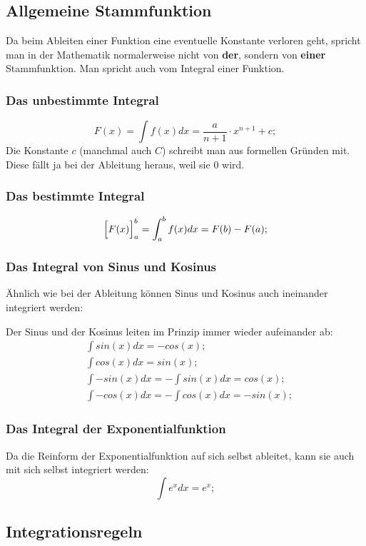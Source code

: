\documentclass[a4paper]{article}
\begin{document}
\subsection{Allgemeine Stammfunktion}
Da beim Ableiten einer Funktion eine eventuelle Konstante verloren geht, spricht man in der Mathematik normalerweise nicht von \textbf{der}, sondern von \textbf{einer} Stammfunktion. Man spricht auch vom Integral einer Funktion.

\subsubsection{Das unbestimmte Integral}
\[
	F(x) = \int f(x) dx = \frac{a}{n + 1} \cdot x ^ {n + 1} + c;
\]
Die Konstante $c$ (manchmal auch $C$) schreibt man aus formellen Gründen mit. Diese fällt ja bei der Ableitung heraus, weil sie $0$ wird.

\subsubsection{Das bestimmte Integral}
\[
	\Bigl[ F(x) \Bigr]_{a}^{b} = \int_{a}^{b} f(x) dx = F(b) - F(a) ;
\]

\subsubsection{Das Integral von Sinus und Kosinus}
Ähnlich wie bei der Ableitung können Sinus und Kosinus auch ineinander integriert werden:

Der Sinus und der Kosinus leiten im Prinzip immer wieder aufeinander ab:
\begin{align*}
	& \int sin(x) dx = -cos(x) ;
	\\
	& \int cos(x) dx = sin(x) ;
	\\
	& \int -sin(x) dx = - \int sin(x) dx = cos(x) ;
	\\
	& \int -cos(x) dx = - \int cos(x) dx = -sin(x) ;
\end{align*}

\subsubsection{Das Integral der Exponentialfunktion}
Da die Reinform der Exponentialfunktion auf sich selbst ableitet, kann sie auch mit sich selbst integriert werden:
\[
	\int e^x dx = e^x ;
\]

\subsection{Integrationsregeln}
\end{document}
